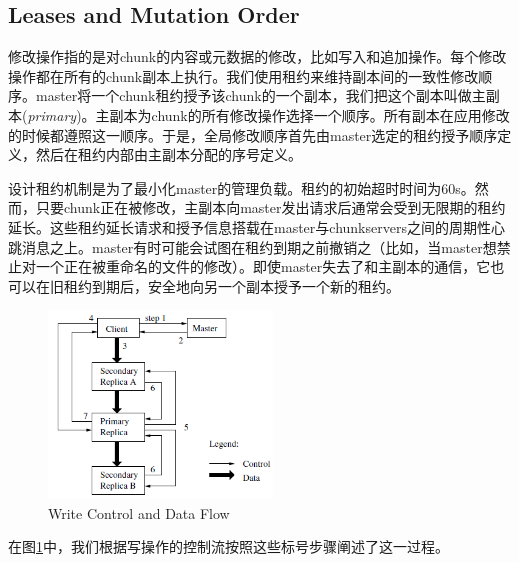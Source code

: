 \documentclass{article}
\begin{document}
\subsection{Leases and Mutation Order}
修改操作指的是对chunk的内容或元数据的修改，比如写入和追加操作。每个修改操作都在所有的chunk副本上执行。我们使用租约来维持副本间的一致性修改顺序。master将一个chunk租约授予该chunk的一个副本，我们把这个副本叫做主副本(\emph{primary})。主副本为chunk的所有修改操作选择一个顺序。所有副本在应用修改的时候都遵照这一顺序。于是，全局修改顺序首先由master选定的租约授予顺序定义，然后在租约内部由主副本分配的序号定义。\par
设计租约机制是为了最小化master的管理负载。租约的初始超时时间为60s。然而，只要chunk正在被修改，主副本向master发出请求后通常会受到无限期的租约延长。这些租约延长请求和授予信息搭载在master与chunkservers之间的周期性心跳消息之上。master有时可能会试图在租约到期之前撤销之（比如，当master想禁止对一个正在被重命名的文件的修改）。即使master失去了和主副本的通信，它也可以在旧租约到期后，安全地向另一个副本授予一个新的租约。
\begin{figure}[htbp]
    \centering\includegraphics[height=5cm]{images/write_control_and_data_flow.png}
    \caption{Write Control and Data Flow}
    \label{fig:write_control_and_data_flow}
\end{figure}
在图\ref{fig:write_control_and_data_flow}中，我们根据写操作的控制流按照这些标号步骤阐述了这一过程。
\end{document}
